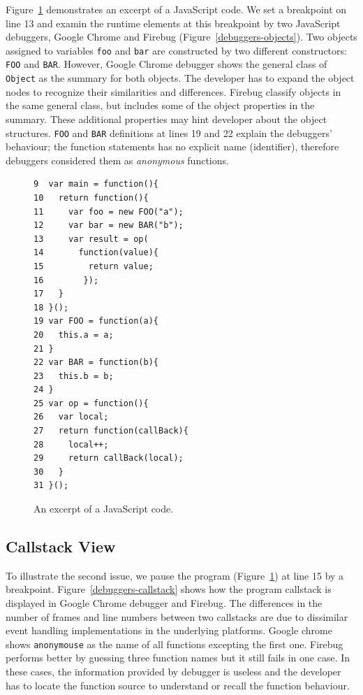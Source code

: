 \documentclass{acm_proc_article-sp}
\begin{document}
Figure~\ref{js-code} demonstrates an excerpt of a JavaScript code. We set a breakpoint on line 13 and examin the runtime elements at this breakpoint by two JavaScript debuggers, Google Chrome and Firebug (Figure~\ref{debuggers-objects}). Two objects assigned to variables {\small\texttt{foo}} and {\small\texttt{bar}} are constructed by two different constructors: {\small\texttt{FOO}} and {\small\texttt{BAR}}. However, Google Chrome debugger shows the general class of {\small\texttt{Object}} as the summary for both objects. The developer has to expand the object nodes to recognize their similarities and differences. Firebug classify objects in the same general class, but includes some of the object properties in the summary. These additional properties may hint developer about the object structures. {\small\texttt{FOO}} and {\small\texttt{BAR}} definitions at lines 19 and 22 explain the debuggers' behaviour; the function statements has no explicit name (identifier), therefore debuggers considered them as \textit{anonymous} functions.


\begin{figure}[htp]
{\small 
\begin{verbatim}
9  var main = function(){
10   return function(){
11     var foo = new FOO("a");
12     var bar = new BAR("b");
13     var result = op(
14       function(value){
15         return value;
16        });
17   }
18 }();
19 var FOO = function(a){
20   this.a = a;
21 }
22 var BAR = function(b){
23   this.b = b;
24 }
25 var op = function(){
26   var local;
27   return function(callBack){
28     local++;
29     return callBack(local);
30   }
31 }();
\end{verbatim}}
\caption{An excerpt of a JavaScript code.}
\label{js-code}
\end{figure}

\subsection{Callstack View}
To illustrate the second issue, we pause the program (Figure~\ref{js-code}) at line 15 by a breakpoint. Figure~\ref{debuggers-callstack} shows how the program callstack is displayed in Google Chrome debugger and Firebug. The differences in the number of frames and line numbers between two callstacks are due to dissimilar event handling implementations in the underlying platforms. Google chrome shows {\small\texttt{anonymouse}} as the name of all functions excepting the first one. Firebug performs better by guessing three function names but it still fails in one case. In these cases, the information provided by debugger is useless and the developer has to locate the function source to understand or recall the function behaviour. 
\end{document}
